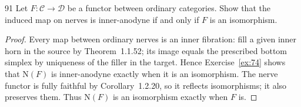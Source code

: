 \begin{exercise}{91}
Let $F\colon\mathcal C\to\mathcal D$ be a functor between ordinary categories.
Show that the induced map on nerves is inner-anodyne if and only if $F$ is an
isomorphism.

\begin{proof}
Every map between ordinary nerves is an inner fibration:
fill a given inner horn in the source by Theorem~1.1.52;
its image equals the prescribed bottom simplex by uniqueness of the
filler in the target.
Hence Exercise~\ref{ex:74} shows that $\mathrm N(F)$ is inner-anodyne
exactly when it is an isomorphism.
The nerve functor is fully faithful by Corollary~1.2.20, so it
reflects isomorphisms; it also preserves them.
Thus $\mathrm N(F)$ is an isomorphism exactly when $F$ is.
\end{proof}
\end{exercise}

